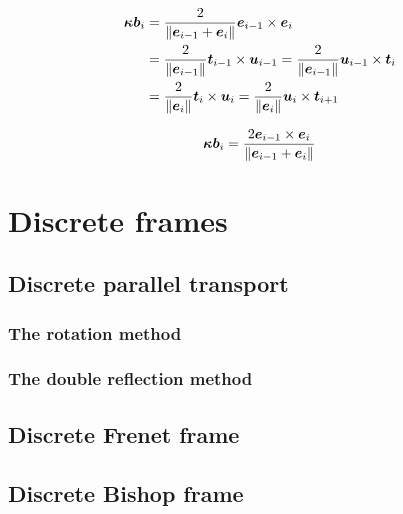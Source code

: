 \begin{equation}
	\begin{aligned}
	\boldsymbol{\kappa b}_{i} 
		&	=  \frac{2}{\lVert\boldsymbol{e}_{i-1} + \boldsymbol{e}_{i}\rVert}  \boldsymbol{e}_{i-1} \times  \boldsymbol{e}_{i}
		\\
		&	= \frac{2}{\lVert\boldsymbol{e}_{i-1}\rVert} \boldsymbol{t}_{i-1} \times  \boldsymbol{u}_{i-1}
			= \frac{2}{\lVert\boldsymbol{e}_{i-1}\rVert} \boldsymbol{u}_{i-1} \times  \boldsymbol{t}_{i}
		\\
		&	= \frac{2}{\lVert\boldsymbol{e}_{i}\rVert} \boldsymbol{t}_{i} \times  \boldsymbol{u}_{i}
			= \frac{2}{\lVert\boldsymbol{e}_{i}\rVert} \boldsymbol{u}_{i} \times  \boldsymbol{t}_{i+1}
	\end{aligned}
\end{equation}

\begin{equation}
	\boldsymbol{\kappa b}_{i} =  \frac{2 \boldsymbol{e}_{i-1} \times  \boldsymbol{e}_{i}}{\lVert\boldsymbol{e}_{i-1} + \boldsymbol{e}_{i}\rVert}
\end{equation}

\section{Discrete frames}

\subsection{Discrete parallel transport}
	\subsubsection{The rotation method}
	\subsubsection{The double reflection method}

\subsection{Discrete Frenet frame}
\subsection{Discrete Bishop frame}

\cite{Hanson95,Wang2008}



